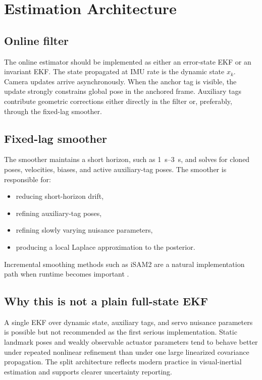 \documentclass[11pt]{article}
\begin{document}
\section{Estimation Architecture}
\subsection{Online filter}
The online estimator should be implemented as either an error-state EKF or an invariant EKF. The state propagated at IMU rate is the dynamic state $x_k$. Camera updates arrive asynchronously. When the anchor tag is visible, the update strongly constrains global pose in the anchored frame. Auxiliary tags contribute geometric corrections either directly in the filter or, preferably, through the fixed-lag smoother.

\subsection{Fixed-lag smoother}
The smoother maintains a short horizon, such as \SIrange{1}{3}{s}, and solves for cloned poses, velocities, biases, and active auxiliary-tag poses. The smoother is responsible for:
\begin{itemize}[leftmargin=1.5em]
    \item reducing short-horizon drift,
    \item refining auxiliary-tag poses,
    \item refining slowly varying nuisance parameters,
    \item producing a local Laplace approximation to the posterior.
\end{itemize}
Incremental smoothing methods such as iSAM2 are a natural implementation path when runtime becomes important \citep{kaess2012isam2}.

\subsection{Why this is not a plain full-state EKF}
A single EKF over dynamic state, auxiliary tags, and servo nuisance parameters is possible but not recommended as the first serious implementation. Static landmark poses and weakly observable actuator parameters tend to behave better under repeated nonlinear refinement than under one large linearized covariance propagation. The split architecture reflects modern practice in visual-inertial estimation and supports clearer uncertainty reporting.
\end{document}
